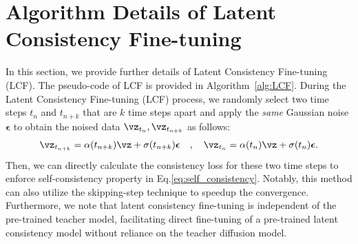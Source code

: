 \documentclass{article} %
\begin{document}
\section{Algorithm Details of Latent Consistency Fine-tuning \label{appendix:LCF}}

In this section, we provide further details of Latent Consistency Fine-tuning (LCF). The pseudo-code of LCF is provided in Algorithm~\ref{alg:LCF}. During the Latent Consistency Fine-tuning (LCF) process, we randomly select two time steps $t_n$ and $t_{n+k}$ that are $k$ time steps apart and apply the \textit{same} Gaussian noise $\boldsymbol{\epsilon}$ to obtain the noised data $\vz_{t_n},\vz_{t_{n+k}}$ as follows:
$$
\vz_{t_{n+k}} = \alpha(t_{n+k})\vz + \sigma(t_{n+k}) \boldsymbol{\epsilon}\quad, \quad \vz_{t_{n}} = \alpha(t_{n})\vz + \sigma(t_{n}) \boldsymbol{\epsilon}.
$$
Then, we can directly calculate the consistency loss for these two time steps to enforce self-consistency property in Eq.\ref{eq:self_consistency}. Notably, this method can also utilize the skipping-step technique to speedup the convergence.
Furthermore, we note that latent consistency fine-tuning is independent of the pre-trained teacher model, facilitating direct fine-tuning of a pre-trained latent consistency model without reliance on the teacher diffusion model.
\end{document}
